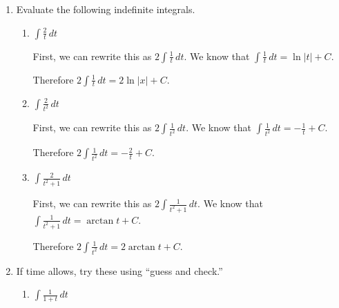 \documentclass[main]{subfiles}
\begin{document}
\begin{enumerate}[resume,topsep=0pt]
\begin{enumerate}
  \end{enumerate}

  \item Evaluate the following indefinite integrals.
  \begin{enumerate}[topsep=0pt]
    \item 
    \begin{problem}[\vfill]
        $\displaystyle \int\frac{2}{t}\,dt$
    \end{problem}
    
    \begin{solution}
        First, we can rewrite this as 
        $\displaystyle 2\int\frac{1}{t}\,dt$.
        We know that $\displaystyle \int \frac{1}{t}\,dt = \ln|t| + C$.
        
        Therefore $\displaystyle 2\int\frac{1}{t}\,dt =
        \boxed{2\ln|x| + C.}$
    \end{solution}
    
    \item 
    \begin{problem}[\vfill]
        $\displaystyle \int\frac{2}{t^2}\,dt$
    \end{problem}

    \begin{solution}
        First, we can rewrite this as 
        $\displaystyle 2\int\frac{1}{t^2}\,dt$.
        We know that $\displaystyle \int \frac{1}{t^2}\,dt = 
        -\frac{1}{t}+C$.
        
        Therefore $\displaystyle 2\int\frac{1}{t^2}\,dt =
        \boxed{-\frac{2}{t} + C.}$
    \end{solution}
    
    \item 
    \begin{problem}[\vfill]
        $\displaystyle \int\frac{2}{t^2+1}\,dt$
    \end{problem}

    \begin{solution}
        First, we can rewrite this as 
        $\displaystyle 2\int\frac{1}{t^2+1}\,dt$.
        We know that $\displaystyle \int \frac{1}{t^2+1}\,dt = 
        \arctan t +C$.
        
        Therefore $\displaystyle 2\int\frac{1}{t^2}\,dt =
        \boxed{2\arctan t + C.}$
    \end{solution}
  \end{enumerate}

  \item If time allows, try these using ``guess and check.''
  \begin{enumerate}[topsep=0pt]
    \item 
    \begin{problem}[\vfill]
        $\displaystyle \int\frac{1}{1+t}\,dt$
    \end{problem}


\end{enumerate}
\end{enumerate}
\end{document}
